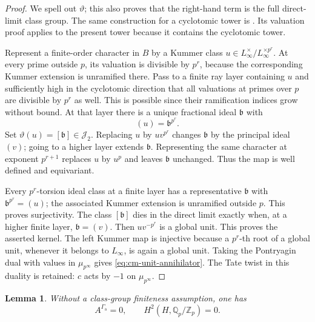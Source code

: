 \documentclass[11pt]{article}
\newtheorem{lemma}[theorem]{Lemma}
\theoremstyle{definition}\newtheorem{definition}[theorem]{Definition}
\begin{document}
\begin{proof}
We spell out \(\vartheta\); this also proves that the right-hand term
is the full direct-limit class group.
The same construction for a cyclotomic tower is
\cite[Proposition 3.3.9 and Corollary 3.3.14]{SharifiIwasawaNotes}.
Its valuation proof applies to the present tower because it
contains the cyclotomic tower.

Represent a finite-order character in \(B\) by a Kummer class
\(u\in L_\infty^\times/L_\infty^{\times p^r}\).
At every prime outside \(p\), its valuation is divisible by \(p^r\),
because the corresponding Kummer extension is unramified there.
Pass to a finite ray layer containing \(u\) and sufficiently high
in the cyclotomic direction that all valuations at primes over
\(p\) are divisible by \(p^r\) as well.
This is possible since their ramification indices grow without
bound.
At that layer there is a unique fractional ideal \(\mathfrak b\)
with
\[
                         (u)=\mathfrak b^{p^r}.
\]
Set \(\vartheta(u)=[\mathfrak b]\in\mathcal J_2\).
Replacing \(u\) by \(uv^{p^r}\) changes \(\mathfrak b\) by
the principal ideal \((v)\); going to a higher layer extends
\(\mathfrak b\).
Representing the same character at exponent \(p^{r+1}\) replaces
\(u\) by \(u^p\) and leaves \(\mathfrak b\) unchanged.
Thus the map is well defined and equivariant.

Every \(p^r\)-torsion ideal class at a finite layer has a
representative \(\mathfrak b\) with
\(\mathfrak b^{p^r}=(u)\); the associated Kummer extension is
unramified outside \(p\).
This proves surjectivity.
The class \([\mathfrak b]\) dies in the direct limit exactly when,
at a higher finite layer, \(\mathfrak b=(v)\).
Then \(uv^{-p^r}\) is a global unit.
This proves the asserted kernel.
The left Kummer map is injective because a \(p^r\)-th root of a
global unit, whenever it belongs to \(L_\infty\), is again a global
unit.
Taking the Pontryagin dual with values in \(\mu_{p^\infty}\)
gives \eqref{eq:cm-unit-annihilator}.
The Tate twist in this duality is retained: \(c\) acts by \(-1\)
on \(\mu_{p^\infty}\).
\end{proof}

\begin{lemma}\label{lem:cm-anticyclotomic-invariants}
Without a class-group finiteness assumption, one has
\[
 A^{\Gamma_{\mathrm a}}=0,\qquad
 H^2(H,\mathbb Q_p/\mathbb Z_p)=0 .
\]
\end{lemma}
\end{document}
